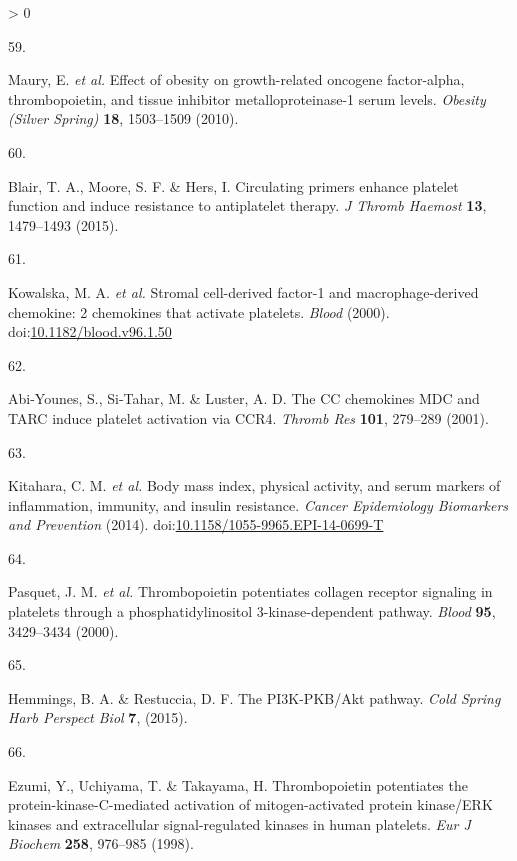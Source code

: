 \documentclass[11pt,twoside]{bristolthesis}
\newlength{\cslhangindent}
\newlength{\csllabelwidth}
\newenvironment{CSLReferences}[2] %
 {%
  \setlength{\parindent}{0pt}
  \ifodd #1 \everypar{\setlength{\hangindent}{\cslhangindent}}\ignorespaces\fi
  \ifnum #2 > 0
  \setlength{\parskip}{#2\baselineskip}
  \fi
 }%
 {}
\newcommand{\CSLLeftMargin}[1]{\parbox[t]{\csllabelwidth}{#1}}
\newcommand{\CSLRightInline}[1]{\parbox[t]{\linewidth - \csllabelwidth}{#1}\break}
\begin{document}
\begin{CSLReferences}{0}{0}
\leavevmode\hypertarget{ref-Maury2010a}{}%
\CSLLeftMargin{59. }
\CSLRightInline{Maury, E. \emph{et al.} {Effect of obesity on growth-related oncogene factor-alpha, thrombopoietin, and tissue inhibitor metalloproteinase-1 serum levels}. \emph{Obesity (Silver Spring)} \textbf{18}, 1503--1509 (2010).}

\leavevmode\hypertarget{ref-Blair2015}{}%
\CSLLeftMargin{60. }
\CSLRightInline{Blair, T. A., Moore, S. F. \& Hers, I. {Circulating primers enhance platelet function and induce resistance to antiplatelet therapy}. \emph{J Thromb Haemost} \textbf{13}, 1479--1493 (2015).}

\leavevmode\hypertarget{ref-Kowalska2000}{}%
\CSLLeftMargin{61. }
\CSLRightInline{Kowalska, M. A. \emph{et al.} {Stromal cell-derived factor-1 and macrophage-derived chemokine: 2 chemokines that activate platelets}. \emph{Blood} (2000). doi:\href{https://doi.org/10.1182/blood.v96.1.50}{10.1182/blood.v96.1.50}}

\leavevmode\hypertarget{ref-Abi-Younes2001}{}%
\CSLLeftMargin{62. }
\CSLRightInline{Abi-Younes, S., Si-Tahar, M. \& Luster, A. D. {The CC chemokines MDC and TARC induce platelet activation via CCR4}. \emph{Thromb Res} \textbf{101}, 279--289 (2001).}

\leavevmode\hypertarget{ref-Kitahara2014}{}%
\CSLLeftMargin{63. }
\CSLRightInline{Kitahara, C. M. \emph{et al.} {Body mass index, physical activity, and serum markers of inflammation, immunity, and insulin resistance}. \emph{Cancer Epidemiology Biomarkers and Prevention} (2014). doi:\href{https://doi.org/10.1158/1055-9965.EPI-14-0699-T}{10.1158/1055-9965.EPI-14-0699-T}}

\leavevmode\hypertarget{ref-Pasquet2000}{}%
\CSLLeftMargin{64. }
\CSLRightInline{Pasquet, J. M. \emph{et al.} {Thrombopoietin potentiates collagen receptor signaling in platelets through a phosphatidylinositol 3-kinase-dependent pathway}. \emph{Blood} \textbf{95}, 3429--3434 (2000).}

\leavevmode\hypertarget{ref-Hemmings2015}{}%
\CSLLeftMargin{65. }
\CSLRightInline{Hemmings, B. A. \& Restuccia, D. F. {The PI3K-PKB/Akt pathway}. \emph{Cold Spring Harb Perspect Biol} \textbf{7}, (2015).}

\leavevmode\hypertarget{ref-Ezumi1998}{}%
\CSLLeftMargin{66. }
\CSLRightInline{Ezumi, Y., Uchiyama, T. \& Takayama, H. {Thrombopoietin potentiates the protein-kinase-C-mediated activation of mitogen-activated protein kinase/ERK kinases and extracellular signal-regulated kinases in human platelets}. \emph{Eur J Biochem} \textbf{258}, 976--985 (1998).}


\end{CSLReferences}
\end{document}
